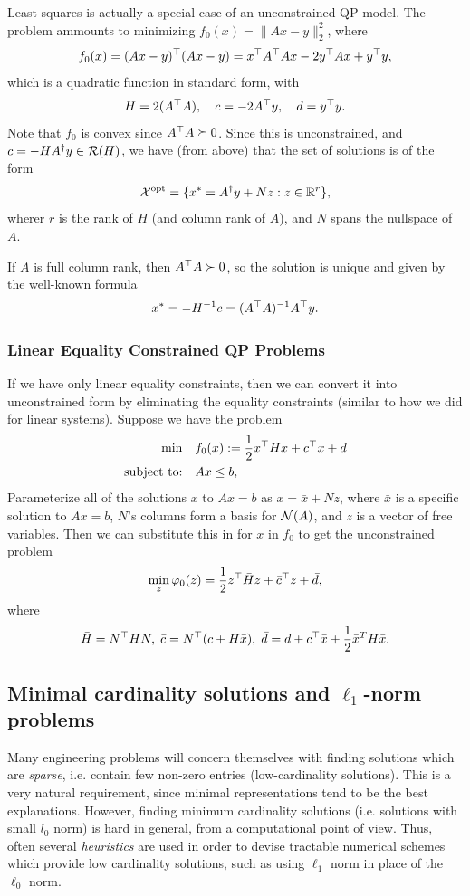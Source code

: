 \documentclass[11 pt]{scrartcl}
\begin{document}
\begin{example}
    Least-squares is actually a special case of an unconstrained QP model. 
    The problem ammounts to minimizing $f_0(x) = \|Ax-y\|_2^2$, where 
    \[ f_0(x) = (Ax-y)^\top (Ax-y) = x^\top A^\top A x - 2y^\top A x + y^\top y,\] 
    which is a quadratic function in standard form, with 
    \[ H = 2(A^\top A),\quad c = -2 A^\top y, \quad d = y^\top y.\] 
    Note that $f_0$ is convex since $A^\top A \succeq 0$. 
    Since this is unconstrained, and $c = -HA^\dagger y\in \mathcal R(H)$, we have (from above) that the set of solutions is of the form 
    \[ \mathcal X^{\text{opt}} = \{x^* = A^\dagger y + Nz : z\in \mathbb R^r\},\] 
    wherer $r$ is the rank of $H$ (and column rank of $A$), and $N$ spans the nullspace of $A$. 

    If $A$ is full column rank, then $A^\top A \succ 0$, so the solution is unique and given by the well-known formula 
    \[ x^* = -H^{-1} c = (A^\top A)^{-1} A^\top y.\] 
\end{example}

\subsubsection{Linear Equality Constrained QP Problems}

If we have only linear equality constraints, then we can convert it into unconstrained form by eliminating the equality constraints (similar to how we did for linear systems).
Suppose we have the problem 
\begin{align*}
    \min \quad &f_0(x) := \frac 12 x^\top Hx + c^\top x + d\\ 
    \text{subject to: }\;\; & Ax\leq b,
\end{align*}
Parameterize all of the solutions $x$ to $Ax=b$ as $x = \bar{x} + Nz$, where $\bar{x}$ is a specific solution to $Ax=b$, $N$'s columns form a basis for $\mathcal N(A)$, and $z$ is a vector of free variables.
Then we can substitute this in for $x$ in $f_0$ to get the unconstrained problem 
\[ \min_z \varphi_0(z) = \frac 12 z^\top \bar{H} z + \bar{c}^\top z + \bar{d},\] 
where 
\[ \bar{H} = N^\top H N,\; \bar{c} = N^\top (c + H\bar{x}),\; \bar{d} = d + c^\top \bar{x} + \frac 12 \bar{x}^T H \bar{x}.\] 

\subsection{Minimal cardinality solutions and $\ell_1$-norm problems}

Many engineering problems will concern themselves with finding solutions which are \emph{sparse}, i.e. contain few non-zero entries (low-cardinality solutions). 
This is a very natural requirement, since minimal representations tend to be the best explanations. 
However, finding minimum cardinality solutions (i.e. solutions with small $l_0$ norm) is hard in general, from a computational point of view. 
Thus, often several \emph{heuristics} are used in order to devise tractable numerical schemes which provide low cardinality solutions, such as using $\ell_1$ norm in place of the $\ell_0$ norm. 
\end{document}
